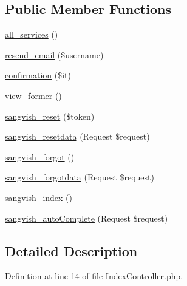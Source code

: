 \subsection*{Public Member Functions}
\begin{DoxyCompactItemize}
\item 
\mbox{\hyperlink{class_responsive_1_1_http_1_1_controllers_1_1_index_controller_a6d5c62abaa3835d4ba5495e55bd19021}{all\+\_\+services}} ()
\item 
\mbox{\hyperlink{class_responsive_1_1_http_1_1_controllers_1_1_index_controller_a6c16cb22355fc59b40b28b686284e006}{resend\+\_\+email}} (\$username)
\item 
\mbox{\hyperlink{class_responsive_1_1_http_1_1_controllers_1_1_index_controller_a75c4acb831d0624f784c3c0e49e0ad32}{confirmation}} (\$it)
\item 
\mbox{\hyperlink{class_responsive_1_1_http_1_1_controllers_1_1_index_controller_aac46d13297bfa2039955bbd50d414ec0}{view\+\_\+former}} ()
\item 
\mbox{\hyperlink{class_responsive_1_1_http_1_1_controllers_1_1_index_controller_a13df1c6af1c0eb14b7d2eb626f06517d}{sangvish\+\_\+reset}} (\$token)
\item 
\mbox{\hyperlink{class_responsive_1_1_http_1_1_controllers_1_1_index_controller_a568f54518a6e52040cae2ff9e0316a28}{sangvish\+\_\+resetdata}} (Request \$request)
\item 
\mbox{\hyperlink{class_responsive_1_1_http_1_1_controllers_1_1_index_controller_a9d71d2c574f09648bdc00f4b32e62c64}{sangvish\+\_\+forgot}} ()
\item 
\mbox{\hyperlink{class_responsive_1_1_http_1_1_controllers_1_1_index_controller_ae448dcac25c0cc0daa64c79c11e63280}{sangvish\+\_\+forgotdata}} (Request \$request)
\item 
\mbox{\hyperlink{class_responsive_1_1_http_1_1_controllers_1_1_index_controller_a102ddc90c5f30fa7831dcf999b905ad1}{sangvish\+\_\+index}} ()
\item 
\mbox{\hyperlink{class_responsive_1_1_http_1_1_controllers_1_1_index_controller_ae9bd9dd42150df3dc1deb9544ded76f7}{sangvish\+\_\+auto\+Complete}} (Request \$request)
\end{DoxyCompactItemize}


\subsection{Detailed Description}


Definition at line 14 of file Index\+Controller.\+php.



